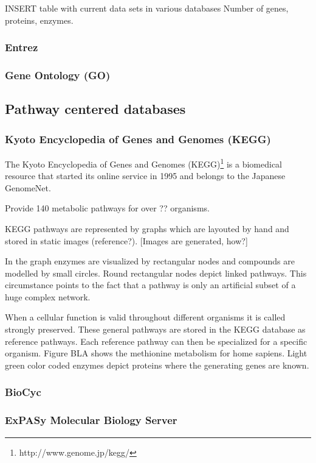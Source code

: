 INSERT table with current data sets in various databases
Number of genes, proteins, enzymes.

\subsubsection{Entrez}

\subsubsection{Gene Ontology (GO)}

\subsection{Pathway centered databases}

\subsubsection{Kyoto Encyclopedia of Genes and Genomes (KEGG)}

The Kyoto Encyclopedia of Genes and Genomes (KEGG)\footnote{http://www.genome.jp/kegg/} is a biomedical resource that started its online service in 1995 and belongs to the Japanese GenomeNet.

Provide 140 metabolic pathways for over ?? organisms.

KEGG pathways are represented by graphs which are layouted by hand and stored in static images (reference?). [Images are generated, how?]

In the graph enzymes are visualized by rectangular nodes and compounds are modelled by small circles. Round rectangular nodes depict linked pathways. This circumstance points to the fact that a pathway is only an artificial subset of a huge complex network. 

When a cellular function is valid throughout different organisms it is called strongly preserved. These general pathways are stored in the KEGG database as reference pathways. Each reference pathway can then be specialized for a specific organism. Figure BLA shows the methionine metabolism for home sapiens. Light green color coded enzymes depict proteins where the generating genes are known. 

\subsubsection{BioCyc}
\subsubsection{ExPASy Molecular Biology Server}

